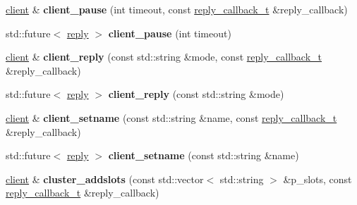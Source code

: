 \begin{DoxyCompactItemize}
\mbox{\label{classcpp__redis_1_1client_acdf001d60d1d82d3f090b7c679e3183e}} 
\hyperlink{classcpp__redis_1_1client}{client} \& {\bfseries client\+\_\+pause} (int timeout, const \hyperlink{classcpp__redis_1_1client_a061a1140d36d2eaeda82b09a0bb3f9f2}{reply\+\_\+callback\+\_\+t} \&reply\+\_\+callback)
\item 
\mbox{\label{classcpp__redis_1_1client_a2c73a6f9b2e3f1a0afbaca9fddd29199}} 
std\+::future$<$ \hyperlink{classcpp__redis_1_1reply}{reply} $>$ {\bfseries client\+\_\+pause} (int timeout)
\item 
\mbox{\label{classcpp__redis_1_1client_a5e49e9bf9bb72659b33013fac751a712}} 
\hyperlink{classcpp__redis_1_1client}{client} \& {\bfseries client\+\_\+reply} (const std\+::string \&mode, const \hyperlink{classcpp__redis_1_1client_a061a1140d36d2eaeda82b09a0bb3f9f2}{reply\+\_\+callback\+\_\+t} \&reply\+\_\+callback)
\item 
\mbox{\label{classcpp__redis_1_1client_a1b378de0c1805069b9bbecd4fca4091c}} 
std\+::future$<$ \hyperlink{classcpp__redis_1_1reply}{reply} $>$ {\bfseries client\+\_\+reply} (const std\+::string \&mode)
\item 
\mbox{\label{classcpp__redis_1_1client_a5c7f977196c1c00e3c732615c0d86ae7}} 
\hyperlink{classcpp__redis_1_1client}{client} \& {\bfseries client\+\_\+setname} (const std\+::string \&name, const \hyperlink{classcpp__redis_1_1client_a061a1140d36d2eaeda82b09a0bb3f9f2}{reply\+\_\+callback\+\_\+t} \&reply\+\_\+callback)
\item 
\mbox{\label{classcpp__redis_1_1client_aa1ab41fda6b2536f652720b7720a0b63}} 
std\+::future$<$ \hyperlink{classcpp__redis_1_1reply}{reply} $>$ {\bfseries client\+\_\+setname} (const std\+::string \&name)
\item 
\mbox{\label{classcpp__redis_1_1client_ac156d5593e1800742188f0eee9016a84}} 
\hyperlink{classcpp__redis_1_1client}{client} \& {\bfseries cluster\+\_\+addslots} (const std\+::vector$<$ std\+::string $>$ \&p\+\_\+slots, const \hyperlink{classcpp__redis_1_1client_a061a1140d36d2eaeda82b09a0bb3f9f2}{reply\+\_\+callback\+\_\+t} \&reply\+\_\+callback)

\end{DoxyCompactItemize}
